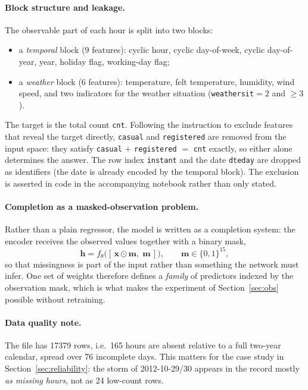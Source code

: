 \documentclass[11pt,a4paper]{article}
\newcommand{\hvec}{\mathbf{h}}
\newcommand{\xvec}{\mathbf{x}}
\newcommand{\mvec}{\mathbf{m}}
\begin{document}
\paragraph{Block structure and leakage.}
The observable part of each hour is split into two blocks:
\begin{itemize}
  \item a \emph{temporal} block ($9$ features): cyclic hour, cyclic day-of-week, cyclic day-of-year,
        year, holiday flag, working-day flag;
  \item a \emph{weather} block ($6$ features): temperature, felt temperature, humidity, wind speed,
        and two indicators for the weather situation (\texttt{weathersit}$=2$ and $\ge 3$).
\end{itemize}
The target is the total count \texttt{cnt}. Following the instruction to exclude features that reveal
the target directly, \texttt{casual} and \texttt{registered}
are removed from the input space: they satisfy \texttt{casual} $+$ \texttt{registered} $=$
\texttt{cnt} exactly, so either alone determines the answer. The row index \texttt{instant} and the
date \texttt{dteday} are dropped as identifiers (the date is already encoded by the temporal block).
The exclusion is asserted in code in the accompanying notebook rather than only stated.

\paragraph{Completion as a masked-observation problem.}
Rather than a plain regressor, the model is written as a completion system: the encoder receives the
observed values together with a binary mask,
\begin{equation}
  \hvec = f_\theta\big([\,\xvec \odot \mvec,\; \mvec\,]\big), \qquad \mvec\in\{0,1\}^{15},
\end{equation}
so that missingness is part of the input rather than something the network must infer. One set of
weights therefore defines a \emph{family} of predictors indexed by the observation mask, which is what
makes the experiment of Section~\ref{sec:obs} possible without retraining.

\paragraph{Data quality note.}
The file has \num{17379} rows, i.e.\ \num{165} hours are absent relative to a full two-year calendar,
spread over 76 incomplete days. This matters for the case study in Section~\ref{sec:reliability}: the
storm of 2012-10-29/30 appears in the record mostly \emph{as missing hours}, not as 24 low-count rows.
\end{document}
